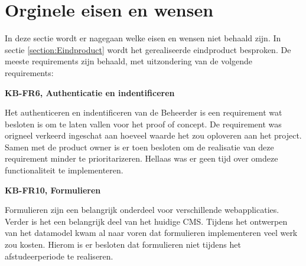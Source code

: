 \section{Orginele eisen en wensen}
In deze sectie wordt er nagegaan welke eisen en wensen niet behaald zijn.
In sectie \ref{section:Eindproduct} wordt het gerealiseerde eindproduct besproken.
De meeste requirements zijn behaald, met uitzondering van de volgende requirements:

\whitespace
\textbf{KB-FR6, Authenticatie en indentificeren}

\whitespace
Het authenticeren en indentificeren van de \gls{Beheerder} is een requirement wat besloten is om te laten vallen voor het proof of concept.
De requirement was origneel verkeerd ingeschat aan hoeveel waarde het zou oploveren aan het project.
Samen met de product owner is er toen besloten om de realisatie van deze requirement minder te prioritarizeren.
Hellaas was er geen tijd over omdeze functionaliteit te implementeren.

\whitespace
\textbf{KB-FR10, Formulieren}

\whitespace
Formulieren zijn een belangrijk onderdeel voor verschillende webapplicaties.
Verder is het een belangrijk deel van het huidige \gls{CMS}.
Tijdens het ontwerpen van het datamodel kwam al naar voren dat formulieren implementeren veel werk zou kosten.
Hierom is er besloten dat formulieren niet tijdens het afstudeerperiode te realiseren.

